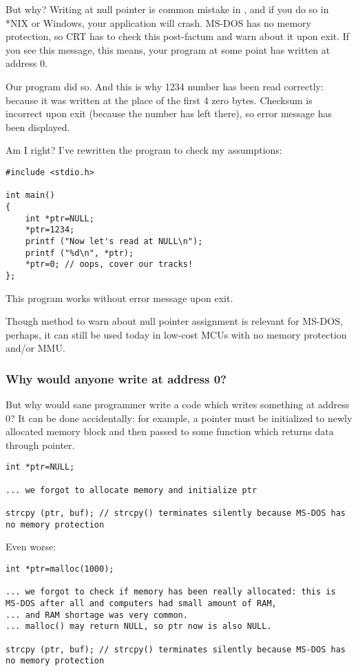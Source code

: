 But why? Writing at null pointer is common mistake in \CCpp, and if you do so in *NIX or Windows, your application will crash.
MS-DOS has no memory protection, so CRT has to check this post-factum and warn about it upon exit.
If you see this message, this means, your program at some point has written at address 0.

Our program did so. And this is why 1234 number has been read correctly: because it was written at the place of the first 4 zero bytes.
Checksum is incorrect upon exit (because the number has left there), so error message has been displayed.

Am I right?
I've rewritten the program to check my assumptions:

\begin{lstlisting}[style=customc]
#include <stdio.h>

int main()
{
	int *ptr=NULL;
	*ptr=1234;
	printf ("Now let's read at NULL\n");
	printf ("%d\n", *ptr);
	*ptr=0; // oops, cover our tracks!
};
\end{lstlisting}

This program works without error message upon exit.

Though method to warn about null pointer assignment is relevant for MS-DOS,
perhaps, it can still be used today in low-cost \ac{MCU}s with no memory protection and/or \ac{MMU}.

\subsubsection{Why would anyone write at address 0?}

But why would sane programmer write a code which writes something at address 0?
It can be done accidentally: for example, a pointer must be initialized to newly allocated memory block and then passed to some function which returns data through pointer.

\begin{lstlisting}[style=customc]
int *ptr=NULL;

... we forgot to allocate memory and initialize ptr

strcpy (ptr, buf); // strcpy() terminates silently because MS-DOS has no memory protection
\end{lstlisting}

Even worse:

\begin{lstlisting}[style=customc]
int *ptr=malloc(1000);

... we forgot to check if memory has been really allocated: this is MS-DOS after all and computers had small amount of RAM,
... and RAM shortage was very common.
... malloc() may return NULL, so ptr now is also NULL.

strcpy (ptr, buf); // strcpy() terminates silently because MS-DOS has no memory protection
\end{lstlisting}

